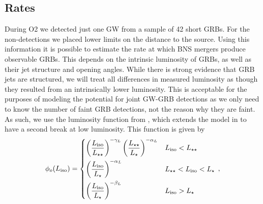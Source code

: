 \documentclass[11pt]{cuthesis}
\begin{document}
\subsection{Rates}
During O2 we detected just one GW from a sample of 42 short GRBs. For the non-detections we placed lower limits on the distance to the source. Using this information it is possible to estimate the rate at which BNS mergers produce observable GRBs. This depends on the intrinsic luminosity of GRBs, as well as their jet structure and opening angles. While there is strong evidence that GRB jets are structured, we will treat all differences in measured luminosity as though they resulted from an intrinsically lower luminosity. This is acceptable for the purposes of modeling the potential for joint GW-GRB detections as we only need to know the number of faint GRB detections, not the reason why they are faint. As such, we use the luminosity function from \cite{GW170817_GRB}, which extends the model in \cite{wanderman} to have a second break at low luminosity. This function is given by
\begin{equation}
    \label{grb luminosity}
    \phi_{o}(L_\text{iso}) = 
    \begin{dcases}
          \left(\frac{L_\text{iso}}{L_{\star\star}}\right)^{-\gamma_L}\left(\frac{L_{\star\star}}{L_{\star}}\right)^{-\alpha_L} & L_\text{iso} < L_{\star\star} \\
           \left(\frac{L_\text{iso}}{L_{\star}}\right)^{-\alpha_L} & L_{\star\star} <L_\text{iso} < L_{\star} \\
            \left(\frac{L_\text{iso}}{L_{\star}}\right)^{-\beta_L} & L_\text{iso} > L_{\star} 
    \end{dcases} \, ,
\end{equation}
\end{document}
